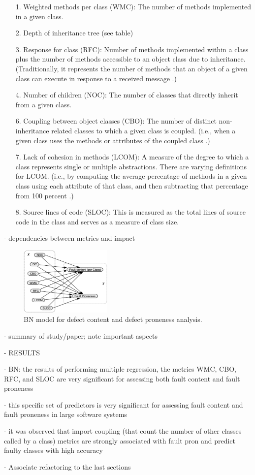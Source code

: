 \begin{itemize}
	\item[1.] Weighted methods per class (WMC): The number of methods implemented in a given class.
	\item[2.] Depth of inheritance tree (see table)
	\item[3.] Response for class (RFC): Number of methods implemented within a class plus the number of methods accessible to an object class due to inheritance. (Traditionally, it represents the number of methods that an object of a given class can execute in response to a received message \cite{b9pai2007empirical}.)
	\item[4.] Number of children (NOC): The number of classes that directly inherit from a given class.
	\item[6.] Coupling between object classes (CBO): The number of distinct non-inheritance related classes to which a given class is coupled. (i.e., when a given class uses the methods or attributes of the coupled class \cite{b9pai2007empirical}.)
	\item[7.] Lack of cohesion in methods (LCOM): A measure of the degree to which a class represents single or multiple abstractions. There are varying definitions for LCOM. (i.e., by computing the average percentage of methods in a given class using each attribute of that class, and then subtracting that percentage from 100 percent \cite{b9pai2007empirical}.)
	\item[8.] Source lines of code (SLOC): This is measured as the total lines of source code in the class and serves as a measure of class size.
\end{itemize}

- dependencies between metrics and impact

\begin{figure}[htbp]
	\centerline{\includegraphics[width=0.4\textwidth]{pictures/bn2.png}}
	\caption{BN model for defect content and defect proneness analysis.}
	\label{fig2bn}
\end{figure}

- summary of study/paper; note important aspects

- RESULTS 

- BN: the results of performing multiple regression, the metrics WMC, CBO, RFC, and SLOC are very significant for assessing both fault content and fault proneness

- this specific set of predictors is very significant for assessing fault content and fault proneness in large software systems

- it was observed that import coupling (that count the number of other classes called by a class) metrics are strongly associated with fault
pron and predict faulty classes with high accuracy

- Associate refactoring to the last sections
